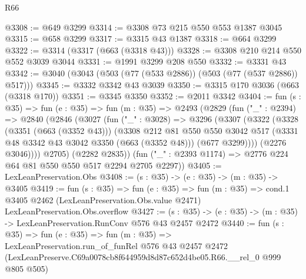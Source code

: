 \begin{lexlean}{R66}
\begin{coremodule}
@3308 := @649 @3299
@3314 := @3308 @73 @215 @550 @553 @1387 @3045
@3315 := @658 @3299
@3317 := @3315 @43 @1387
@3318 := @664 @3299
@3322 := @3314 (@3317 (@663 (@3318 @43)))
@3328 := @3308 @210 @214 @550 @552 @3039 @3044
@3331 := @1991 @3299 @208 @550
@3332 := @3331 @43
@3342 := @3040 (@3043 (@503 (@77 (@533 @2886)) (@503 (@77 (@537 @2886)) @517)))
@3345 := @3332 @3342 @43 @3039
@3350 := @3315 @170 @3036 (@663 (@3318 @170))
@3351 := @3345 @3350
@3352 := @2011 @3342
@3404 := fun (s : @35) =>
  fun (e : @35) =>
  fun (m : @35) =>
  @2493
    (@2829
      (fun ("_" : @2394) =>
      @2840
        (@2846
          (@3027
            (fun ("_" : @3028) =>
            @3296
              (@3307
                (@3322
                  (@3328
                    (@3351 (@663 (@3352 @43)))
                    (@3308
                      @212
                      @81
                      @550
                      @550
                      @3042
                      @517
                      (@3331 @48 @3342 @43 @3042 @3350 (@663 (@3352 @48)))
                      (@677 @3299))))
                (@2276 @3046))))
          @2705)
        (@2282 @2835))
      (fun ("_" : @2393 @1174) => @2776 @224 @64 @81 @550 @550 @517 @2294 @2705 @2297))
@3405 := LexLeanPreservation.Obs
@3408 := (s : @35) -> (e : @35) -> (m : @35) -> @3405
@3419 := fun (s : @35) =>
  fun (e : @35) =>
  fun (m : @35) =>
  cond.{1} @3405 @2462 (LexLeanPreservation.Obs.value @2471) LexLeanPreservation.Obs.overflow
@3427 := (s : @35) -> (e : @35) -> (m : @35) -> LexLeanPreservation.RunConv @576 @43 @2457 @2472
@3440 := fun (s : @35) =>
  fun (e : @35) =>
  fun (m : @35) =>
  LexLeanPreservation.run_of_funRel
    @576
    @43
    @2457
    @2472
    (LexLeanPreserve.C69a0078cb8f644959d8d87c652d4be05.R66.__rel_0 @999 @805 @505)
\end{coremodule}
\end{lexlean}
